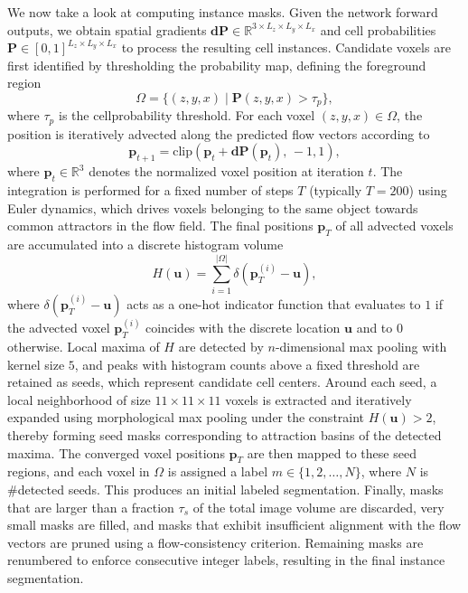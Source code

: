 We now take a look at computing instance masks. Given the network forward outputs, we obtain spatial gradients $\mathbf{dP} \in \mathbb{R}^{3 \times L_z \times L_y \times L_x}$ and cell probabilities $\mathbf{P} \in [0,1]^{L_z \times L_y \times L_x}$ to process the resulting cell instances. Candidate voxels are first identified by thresholding the probability map, defining the foreground region
\begin{equation}
\Omega = \{ (z,y,x) \mid \mathbf{P}(z,y,x) > \tau_p \},
\end{equation}
where $\tau_p$ is the cellprobability threshold. For each voxel $(z,y,x) \in \Omega$, the position is iteratively advected along the predicted flow vectors according to
\begin{equation}
\mathbf{p}_{t+1} = \mathrm{clip}\!\left( \mathbf{p}_{t} + \mathbf{dP}(\mathbf{p}_{t}), \, -1, 1 \right),
\end{equation}
where $\mathbf{p}_t \in \mathbb{R}^3$ denotes the normalized voxel position at iteration $t$. The integration is performed for a fixed number of steps $T$ (typically $T=200$) using Euler dynamics, which drives voxels belonging to the same object towards common attractors in the flow field. The final positions $\mathbf{p}_T$ of all advected voxels are accumulated into a discrete histogram volume
\begin{equation}
H(\mathbf{u}) = \sum_{i=1}^{|\Omega|} \delta(\mathbf{p}_T^{(i)} - \mathbf{u}),
\end{equation}
where $\delta(\mathbf{p}_T^{(i)} - \mathbf{u})$ acts as a one-hot indicator function that evaluates to $1$ if the advected voxel $\mathbf{p}_T^{(i)}$ coincides with the discrete location $\mathbf{u}$ and to $0$ otherwise. Local maxima of $H$ are detected by $n$-dimensional max pooling with kernel size $5$, and peaks with histogram counts above a fixed threshold are retained as seeds, which represent candidate cell centers. Around each seed, a local neighborhood of size $11 \times 11 \times 11$ voxels is extracted and iteratively expanded using morphological max pooling under the constraint $H(\mathbf{u}) > 2$, thereby forming seed masks corresponding to attraction basins of the detected maxima. The converged voxel positions $\mathbf{p}_T$ are then mapped to these seed regions, and each voxel in $\Omega$ is assigned a label $m \in \{1,2,\dots,N\}$, where $N$ is \#detected seeds. This produces an initial labeled segmentation.
Finally, masks that are larger than a fraction $\tau_s$ of the total image volume are discarded, very small masks are filled, and masks that exhibit insufficient alignment with the flow vectors are pruned using a flow-consistency criterion. Remaining masks are renumbered to enforce consecutive integer labels, resulting in the final instance segmentation.


